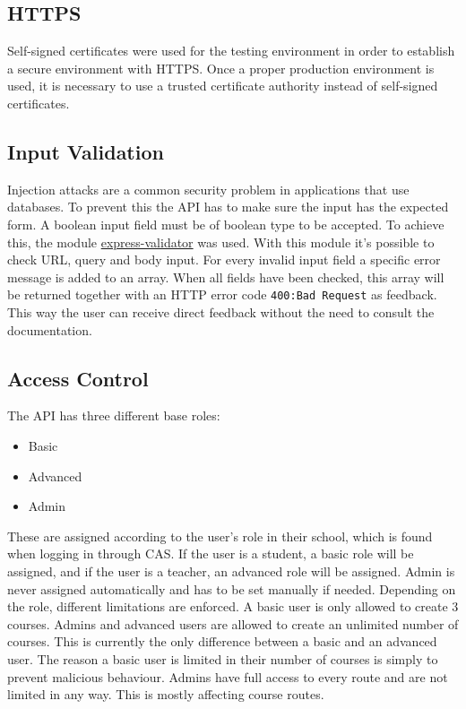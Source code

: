 \subsection{HTTPS} \label{https}
Self-signed certificates were used for the testing environment in order to establish a secure environment with HTTPS. Once a proper production environment is used, it is necessary to use a trusted certificate authority instead of self-signed certificates.

\subsection{Input Validation}
Injection attacks are a common security problem in applications that use databases. To prevent this the API has to make sure the input has the expected form. A boolean input field must be of boolean type to be accepted. To achieve this, the module \href{https://github.com/ctavan/express-validator}{express-validator} was used. With this module it's possible to check URL, query and body input. For every invalid input field a specific error message is added to an array. When all fields have been checked, this array will be returned together with an HTTP error code \texttt{400:\@ Bad Request} as feedback. This way the user can receive direct feedback without the need to consult the documentation.

\subsection{Access Control}
The API has three different base roles:
\begin{itemize}
\item Basic
\item Advanced
\item Admin
\end{itemize}
These are assigned according to the user's role in their school, which is found when logging in through CAS. If the user is a student, a basic role will be assigned, and if the user is a teacher, an advanced role will be assigned. Admin is never assigned automatically and has to be set manually if needed. Depending on the role, different limitations are enforced. A basic user is only allowed to create 3 courses. Admins and advanced users are allowed to create an unlimited number of courses. This is currently the only difference between a basic and an advanced user. The reason a basic user is limited in their number of courses is simply to prevent malicious behaviour. Admins have full access to every route and are not limited in any way. This is mostly affecting course routes.

